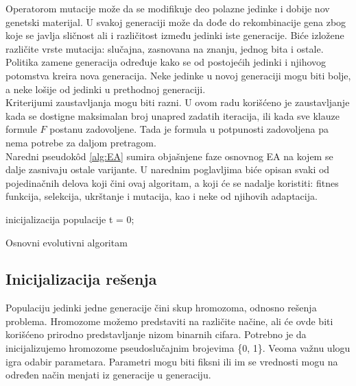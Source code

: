 \documentclass[a4paper]{article}
\begin{document}
Operatorom mutacije može da se modifikuje deo polazne jedinke i dobije nov genetski materijal. 
U svakoj generaciji može da dođe do rekombinacije gena zbog koje se 
javlja sličnost ali i različitost između jedinki iste generacije. 
Biće izložene različite vrste mutacija: slučajna, zasnovana na znanju, jednog bita i ostale. \\

Politika zamene generacija određuje kako se od postojećih jedinki i 
njihovog potomstva kreira nova generacija. Neke jedinke u novoj generaciji mogu biti bolje,
a neke lošije od jedinki u prethodnoj generaciji. \\

Kriterijumi zaustavljanja mogu biti razni. U ovom radu korišćeno je zaustavljanje 
kada se dostigne maksimalan broj unapred zadatih iteracija, ili kada sve klauze 
formule $F$ postanu zadovoljene. 
Tada je formula u potpunosti zadovoljena pa nema potrebe za daljom pretragom.\\

Naredni pseudok\^ od \ref{alg:EA} sumira objašnjene faze osnovnog EA na kojem se dalje
zasnivaju ostale varijante. U narednim poglavljima biće opisan 
svaki od pojedinačnih delova koji čini ovaj algoritam, a koji će se nadalje koristiti: 
fitnes funkcija, selekcija, ukrštanje i mutacija, kao i neke od njihovih adaptacija.\\

\begin{algorithm}[H]
\SetAlgoLined
{}

\BlankLine
 inicijalizacija populacije\;
 t = 0; \\
\caption{Osnovni evolutivni algoritam}\label{alg:EA}
\end{algorithm}


\subsection{Inicijalizacija rešenja}
\label{sec:ea_init}
Populaciju jedinki jedne generacije čini skup hromozoma, odnosno rešenja problema.
Hromozome možemo predstaviti na različite načine, ali će ovde biti korišćeno
prirodno predstavljanje nizom binarnih cifara.
Potrebno je da inicijalizujemo hromozome pseudoslučajnim brojevima \{0, 1\}.
Veoma važnu ulogu igra odabir parametara. Parametri mogu biti fiksni ili im se vrednosti 
mogu na određen način menjati iz generacije u generaciju.
\end{document}
